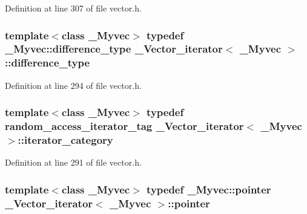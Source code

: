 Definition at line 307 of file vector.\+h.

\hypertarget{class___vector__iterator_a2ae251a7a575573a37b141db607a2f3d}{
\subsubsection[{difference\+\_\+type}]{\setlength{\rightskip}{0pt plus 5cm}template$<$class \+\_\+\+Myvec$>$ typedef \+\_\+\+Myvec\+::difference\+\_\+type {\bf \+\_\+\+Vector\+\_\+iterator}$<$ \+\_\+\+Myvec $>$\+::{\bf difference\+\_\+type}}}\label{class___vector__iterator_a2ae251a7a575573a37b141db607a2f3d}


Definition at line 294 of file vector.\+h.

\hypertarget{class___vector__iterator_a006e733e2d90ae9efd29706dfa13b852}{
\subsubsection[{iterator\+\_\+category}]{\setlength{\rightskip}{0pt plus 5cm}template$<$class \+\_\+\+Myvec$>$ typedef random\+\_\+access\+\_\+iterator\+\_\+tag {\bf \+\_\+\+Vector\+\_\+iterator}$<$ \+\_\+\+Myvec $>$\+::{\bf iterator\+\_\+category}}}\label{class___vector__iterator_a006e733e2d90ae9efd29706dfa13b852}


Definition at line 291 of file vector.\+h.

\hypertarget{class___vector__iterator_ab246deee0546c9ff56abdda572e6bfdd}{
\subsubsection[{pointer}]{\setlength{\rightskip}{0pt plus 5cm}template$<$class \+\_\+\+Myvec$>$ typedef \+\_\+\+Myvec\+::pointer {\bf \+\_\+\+Vector\+\_\+iterator}$<$ \+\_\+\+Myvec $>$\+::{\bf pointer}}}\label{class___vector__iterator_ab246deee0546c9ff56abdda572e6bfdd}


